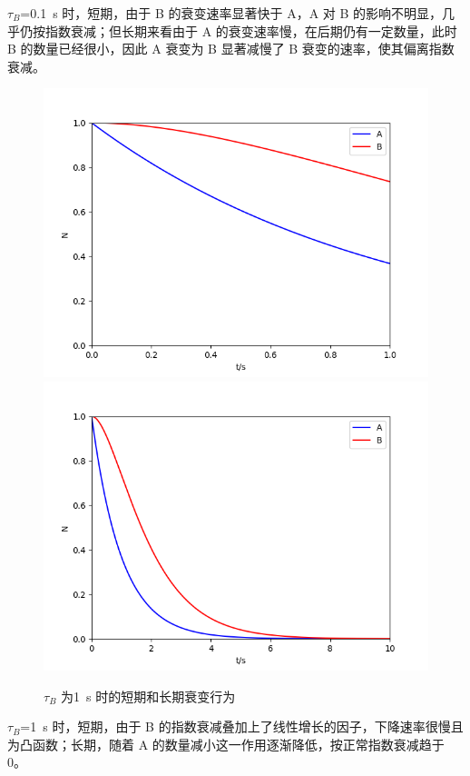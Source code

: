 \documentclass{ctexart}
\begin{document}
$\tau_B$=0.1~s 时，短期，由于 B 的衰变速率显著快于 A，A 对 B 的影响不明显，几乎仍按指数衰减；但长期来看由于 A 的衰变速率慢，在后期仍有一定数量，此时 B 的数量已经很小，因此 A 衰变为 B 显著减慢了 B 衰变的速率，使其偏离指数衰减。

\begin{figure}[h]
\includegraphics[scale = 0.4]{b1_s.png}
\includegraphics[scale = 0.4]{b1_l.png}
\caption{$\tau_B$ 为1~s 时的短期和长期衰变行为}
\end{figure}

$\tau_B$=1~s 时，短期，由于 B 的指数衰减叠加上了线性增长的因子，下降速率很慢且为凸函数；长期，随着 A 的数量减小这一作用逐渐降低，按正常指数衰减趋于 0。
\end{document}
